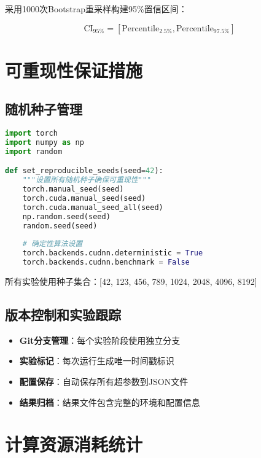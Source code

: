 采用1000次Bootstrap重采样构建95\%置信区间：

\begin{equation}
\text{CI}_{95\%} = [\text{Percentile}_{2.5\%}, \text{Percentile}_{97.5\%}]
\label{eq:bootstrap_ci}
\end{equation}

\section{可重现性保证措施}
\label{app:reproducibility}

\subsection{随机种子管理}
\label{app:random_seeds}

\begin{lstlisting}[language=python, caption=随机种子设置]
import torch
import numpy as np
import random

def set_reproducible_seeds(seed=42):
    """设置所有随机种子确保可重现性"""
    torch.manual_seed(seed)
    torch.cuda.manual_seed(seed)
    torch.cuda.manual_seed_all(seed)
    np.random.seed(seed)
    random.seed(seed)
    
    # 确定性算法设置
    torch.backends.cudnn.deterministic = True
    torch.backends.cudnn.benchmark = False
\end{lstlisting}

所有实验使用种子集合：[42, 123, 456, 789, 1024, 2048, 4096, 8192]

\subsection{版本控制和实验跟踪}
\label{app:version_control}

\begin{itemize}
\item \textbf{Git分支管理}：每个实验阶段使用独立分支
\item \textbf{实验标记}：每次运行生成唯一时间戳标识
\item \textbf{配置保存}：自动保存所有超参数到JSON文件
\item \textbf{结果归档}：结果文件包含完整的环境和配置信息
\end{itemize}

\section{计算资源消耗统计}
\label{app:computational_costs}

